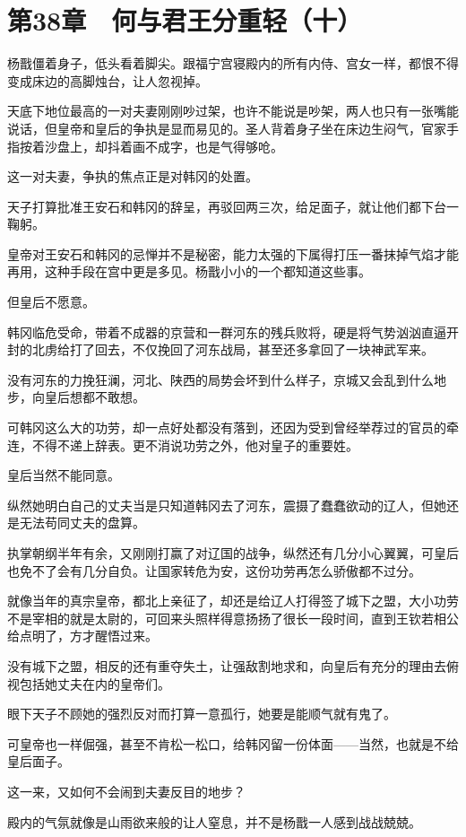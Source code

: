 \section{第38章　何与君王分重轻（十）}

杨戬僵着身子，低头看着脚尖。跟福宁宫寝殿内的所有内侍、宫女一样，都恨不得变成床边的高脚烛台，让人忽视掉。

天底下地位最高的一对夫妻刚刚吵过架，也许不能说是吵架，两人也只有一张嘴能说话，但皇帝和皇后的争执是显而易见的。圣人背着身子坐在床边生闷气，官家手指按着沙盘上，却抖着画不成字，也是气得够呛。

这一对夫妻，争执的焦点正是对韩冈的处置。

天子打算批准王安石和韩冈的辞呈，再驳回两三次，给足面子，就让他们都下台一鞠躬。

皇帝对王安石和韩冈的忌惮并不是秘密，能力太强的下属得打压一番抹掉气焰才能再用，这种手段在宫中更是多见。杨戬小小的一个都知道这些事。

但皇后不愿意。

韩冈临危受命，带着不成器的京营和一群河东的残兵败将，硬是将气势汹汹直逼开封的北虏给打了回去，不仅挽回了河东战局，甚至还多拿回了一块神武军来。

没有河东的力挽狂澜，河北、陕西的局势会坏到什么样子，京城又会乱到什么地步，向皇后想都不敢想。

可韩冈这么大的功劳，却一点好处都没有落到，还因为受到曾经举荐过的官员的牵连，不得不递上辞表。更不消说功劳之外，他对皇子的重要姓。

皇后当然不能同意。

纵然她明白自己的丈夫当是只知道韩冈去了河东，震摄了蠢蠢欲动的辽人，但她还是无法苟同丈夫的盘算。

执掌朝纲半年有余，又刚刚打赢了对辽国的战争，纵然还有几分小心翼翼，可皇后也免不了会有几分自负。让国家转危为安，这份功劳再怎么骄傲都不过分。

就像当年的真宗皇帝，都北上亲征了，却还是给辽人打得签了城下之盟，大小功劳不是宰相的就是太尉的，可回来头照样得意扬扬了很长一段时间，直到王钦若相公给点明了，方才醒悟过来。

没有城下之盟，相反的还有重夺失土，让强敌割地求和，向皇后有充分的理由去俯视包括她丈夫在内的皇帝们。

眼下天子不顾她的强烈反对而打算一意孤行，她要是能顺气就有鬼了。

可皇帝也一样倔强，甚至不肯松一松口，给韩冈留一份体面——当然，也就是不给皇后面子。

这一来，又如何不会闹到夫妻反目的地步？

殿内的气氛就像是山雨欲来般的让人窒息，并不是杨戬一人感到战战兢兢。

